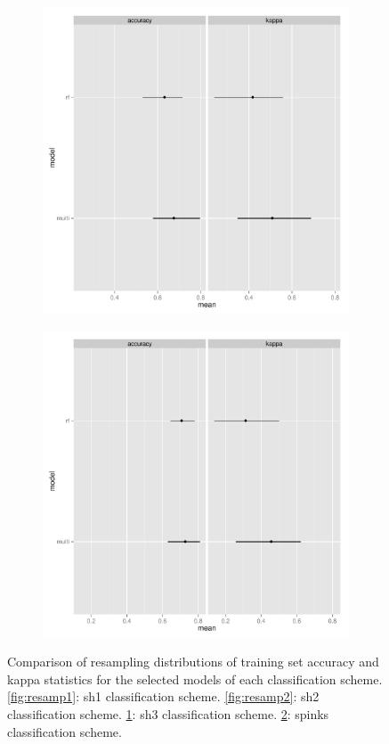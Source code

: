 \documentclass{article}\usepackage{graphicx, color}
\begin{document}
\begin{figure}[t]
  \begin{subfigure}[b]{0.5\textwidth}
    \centering
    \caption{}
    \includegraphics[width = \textwidth]{figure/resamp3}
    \label{fig:resamp3}
  \end{subfigure}%
  \begin{subfigure}[b]{0.5\textwidth}
    \centering
    \caption{}
    \includegraphics[width = \textwidth]{figure/resamp4}
    \label{fig:resamp4}
  \end{subfigure}
  \caption{Comparison of resampling distributions of training set accuracy and kappa statistics for the selected models of each classification scheme. \ref{fig:resamp1}: sh1 classification scheme. \ref{fig:resamp2}: sh2 classification scheme. \ref{fig:resamp3}: sh3 classification scheme. \ref{fig:resamp4}: spinks classification scheme.}
  \label{fig:resamp}
\end{figure}
\end{document}
